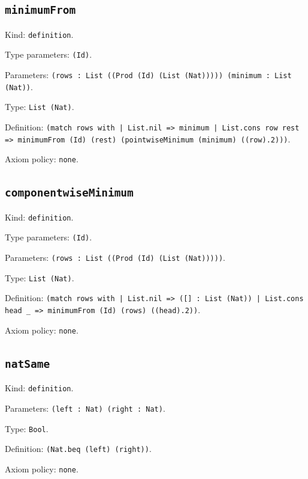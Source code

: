\documentclass[11pt]{article}
\begin{document}
\subsection*{\texttt{minimumFrom}}
\noindent Kind: \texttt{definition}.\par
\noindent Type parameters: \texttt{(Id)}.\par
\noindent Parameters: \texttt{(rows : List ((Prod (Id) (List (Nat))))) (minimum : List (Nat))}.\par
\noindent Type: \texttt{List (Nat)}.\par
\noindent Definition: \texttt{(match rows with | List.nil => minimum | List.cons row rest => minimumFrom (Id) (rest) (pointwiseMinimum (minimum) ((row).2)))}.\par
\noindent Axiom policy: \texttt{none}.\par
\subsection*{\texttt{componentwiseMinimum}}
\noindent Kind: \texttt{definition}.\par
\noindent Type parameters: \texttt{(Id)}.\par
\noindent Parameters: \texttt{(rows : List ((Prod (Id) (List (Nat)))))}.\par
\noindent Type: \texttt{List (Nat)}.\par
\noindent Definition: \texttt{(match rows with | List.nil => ([] : List (Nat)) | List.cons head \_ => minimumFrom (Id) (rows) ((head).2))}.\par
\noindent Axiom policy: \texttt{none}.\par
\subsection*{\texttt{natSame}}
\noindent Kind: \texttt{definition}.\par
\noindent Parameters: \texttt{(left : Nat) (right : Nat)}.\par
\noindent Type: \texttt{Bool}.\par
\noindent Definition: \texttt{(Nat.beq (left) (right))}.\par
\noindent Axiom policy: \texttt{none}.\par
\end{document}

